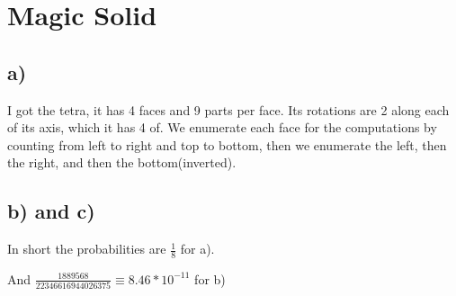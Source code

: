 \section{Magic Solid}

\subsection*{a)} I got the tetra, it has 4 faces and 9 parts per face. Its rotations are 2 along each of its axis, which it has 4 of. We enumerate each face for the computations by counting from left to right and top to bottom, then we enumerate the left, then the right, and then the bottom(inverted).

\subsection*{b) and c)}

In short the probabilities are $\frac{1}{8}$ for a).

And $\frac{1889568}{22346616944026375} \equiv 8.46*10^{-11}$ for b)

